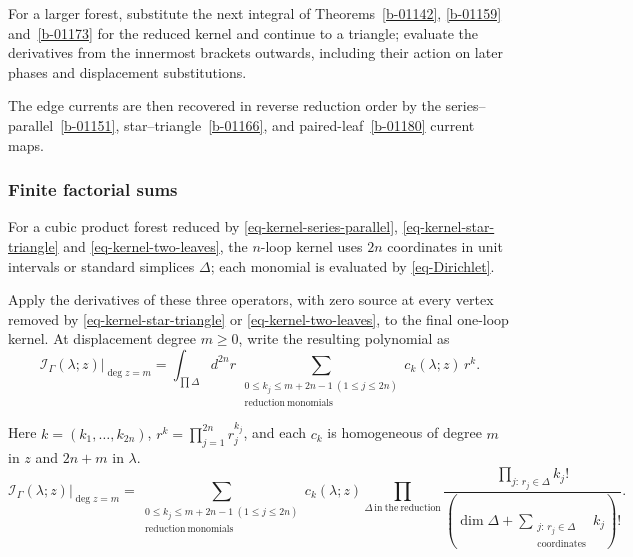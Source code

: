 \documentclass[11pt]{article}
\numberwithin{equation}{section}
\numberwithin{figure}{section}
\numberwithin{table}{section}
\begin{document}
For a larger forest, substitute the next integral of Theorems~\ref{b-01142}, \ref{b-01159} and~\ref{b-01173} for the reduced kernel and continue to a triangle; evaluate the derivatives from the innermost brackets outwards, including their action on later phases and displacement substitutions.

The edge currents are then recovered in reverse reduction order by the series--parallel~\eqref{b-01151}, star--triangle~\eqref{b-01166}, and paired-leaf~\eqref{b-01180} current maps.

\subsubsection{Finite factorial sums}\label{local-B6-finite-heading}

For a cubic product forest reduced by \eqref{eq-kernel-series-parallel}, \eqref{eq-kernel-star-triangle} and \eqref{eq-kernel-two-leaves}, the $n$-loop kernel uses $2n$ coordinates in unit intervals or standard simplices $\Delta$; each monomial is evaluated by \eqref{eq-Dirichlet}.

Apply the derivatives of these three operators, with zero source at every vertex removed by \eqref{eq-kernel-star-triangle} or \eqref{eq-kernel-two-leaves}, to the final one-loop kernel. At displacement degree $m\ge0$, write the resulting polynomial as
\begin{equation*}
\left.\mathcal I_\Gamma(\lambda;z)\right|_{\deg z=m}
=\int_{\prod\Delta}d^{2n}r\,
\sum_{\substack{0\le k_j\le m+2n-1\ (1\le j\le2n)\\\mathrm{reduction\ monomials}}}
c_k(\lambda;z)\,r^k.
\end{equation*}

Here $k=(k_1,\ldots,k_{2n})$, $r^k=\prod_{j=1}^{2n}r_j^{k_j}$, and each $c_k$ is homogeneous of degree $m$ in $z$ and $2n+m$ in $\lambda$.
{\small
\begin{equation*}
\boxed{\displaystyle
\left.\mathcal I_\Gamma(\lambda;z)\right|_{\deg z=m}
=\sum_{\substack{0\le k_j\le m+2n-1\ (1\le j\le2n)\\\mathrm{reduction\ monomials}}}
c_k(\lambda;z)
\prod_{\Delta\,\mathrm{in\ the\ reduction}}
\frac{\prod_{j:\,r_j\in\Delta}k_j!}
{\left(\dim\Delta+\sum_{\substack{j:\,r_j\in\Delta\\\mathrm{coordinates}}}k_j\right)!}.}
\end{equation*}
}
\end{document}

